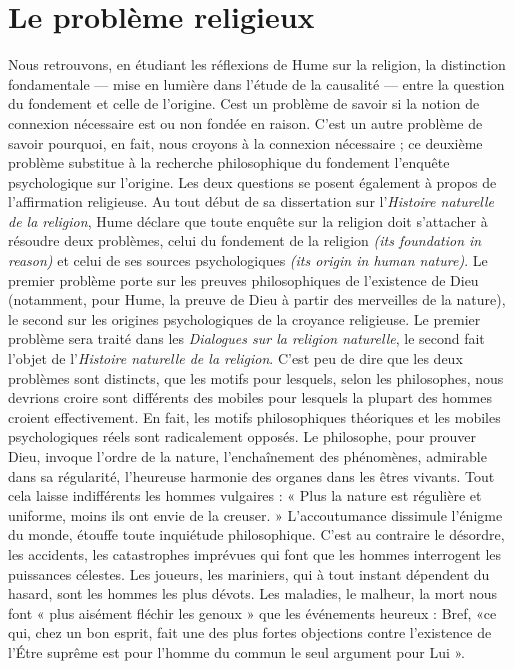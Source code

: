 
\section{Le problème religieux}

Nous retrouvons, en étudiant les réflexions de Hume
sur la religion, la distinction fondamentale — mise en
lumière dans l’étude de la causalité — entre la question
du fondement et celle de l’origine. Cest un problème de
savoir si la notion de connexion nécessaire est ou non
fondée en raison. C’est un autre problème de savoir pourquoi,
en fait, nous croyons à la connexion nécessaire ;
ce deuxième problème substitue à la recherche philosophique
du fondement l’enquête psychologique sur l’origine.
Les deux questions se posent également à propos de l’affirmation
religieuse. Au tout début de sa dissertation sur
l’{\it Histoire naturelle de la religion}, Hume déclare que toute
enquête sur la religion doit s'attacher à résoudre deux
problèmes, celui du fondement de la religion {\it (its foundation in reason)}
et celui de ses sources psychologiques {\it (its origin in human nature)}.
Le premier problème porte sur
les preuves philosophiques de l’existence de Dieu (notamment,
pour Hume, la preuve de Dieu à partir des merveilles de la nature),
le second sur les origines psychologiques de la croyance religieuse.
Le premier problème sera
traité dans les {\it Dialogues sur la religion naturelle}, le second
fait l'objet de l’{\it Histoire naturelle de la religion}. C’est peu
de dire que les deux problèmes sont distincts, que les
motifs pour lesquels, selon les philosophes, nous devrions
croire sont différents des mobiles pour lesquels la plupart
des hommes croient effectivement. En fait, les motifs
philosophiques théoriques et les mobiles psychologiques
réels sont radicalement opposés. Le philosophe, pour
prouver Dieu, invoque l’ordre de la nature, l’enchaînement
des phénomènes, admirable dans sa régularité, l’heureuse
harmonie des organes dans les êtres vivants. Tout cela
laisse indifférents les hommes vulgaires : « Plus la nature
est régulière et uniforme, moins ils ont envie de la creuser. »
L’accoutumance dissimule l'énigme du monde, étouffe
toute inquiétude philosophique. C'est au contraire le
désordre, les accidents, les catastrophes imprévues qui
font que les hommes interrogent les puissances célestes.
Les joueurs, les mariniers, qui à tout instant dépendent du
hasard, sont les hommes les plus dévots. Les maladies,
le malheur, la mort nous font « plus aisément fléchir les
genoux » que les événements heureux : Bref, «ce qui, chez
un bon esprit, fait une des plus fortes objections contre
l'existence de l’Étre suprême est pour l’homme du commun
le seul argument pour Lui ». 

